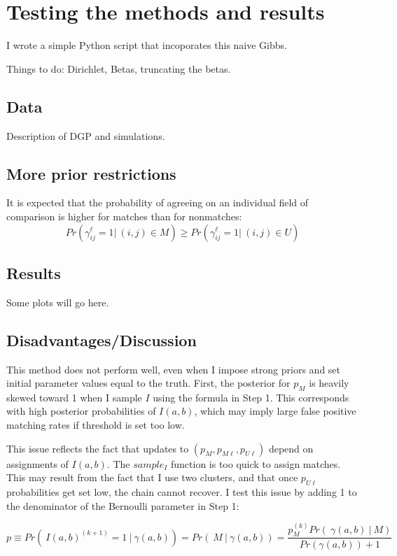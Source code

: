 \documentclass[11pt,reqno]{amsart}
\begin{document}
\section{Testing the methods and results}

I wrote a simple Python script that incoporates this naive Gibbs.  

Things to do: Dirichlet, Betas, truncating the betas. 

\subsection{Data} Description of DGP and simulations. 

\subsection{More prior restrictions}

It is expected that the probability of agreeing on an individual field of comparison is higher for matches than for nonmatches:
$$Pr\left(\gamma_{ij}^{\ell} = 1 |\ (i,j)\in M\right) \geq Pr\left(\gamma_{ij}^{\ell} = 1 |\ (i,j) \in U\right) $$ 
\subsection{Results} Some plots will go here. 

\subsection{Disadvantages/Discussion}

This method does not perform well, even when I impose strong priors and set initial parameter values equal to the truth.   First, the posterior for $p_M$ is heavily skewed toward 1 when I sample $I$ using the formula in Step 1.  This corresponds with high posterior probabilities of $I(a,b)$, which may imply large false positive matching rates if threshold is set too low. 

This issue reflects the fact that updates to $(p_M, p_{M\ell}, p_{U\ell})$ depend on assignments of $I(a,b)$. The $sample_I$ function is too quick to assign matches.  This may result from the fact that I use two clusters, and that once $p_{U\ell}$ probabilities get set low, the chain cannot recover.  I test this issue by adding 1 to the denominator of the Bernoulli parameter in Step 1:

$$p \equiv Pr(\ I(a,b)^{(k+1)}=1\ |\ \gamma(a,b)) = Pr(\ M\  |\  \gamma(a,b)) = \frac{p_M^{(k)}Pr(\ \gamma(a,b)\ |\ M)}{Pr(\gamma(a,b)) + 1} $$ 
\end{document}
